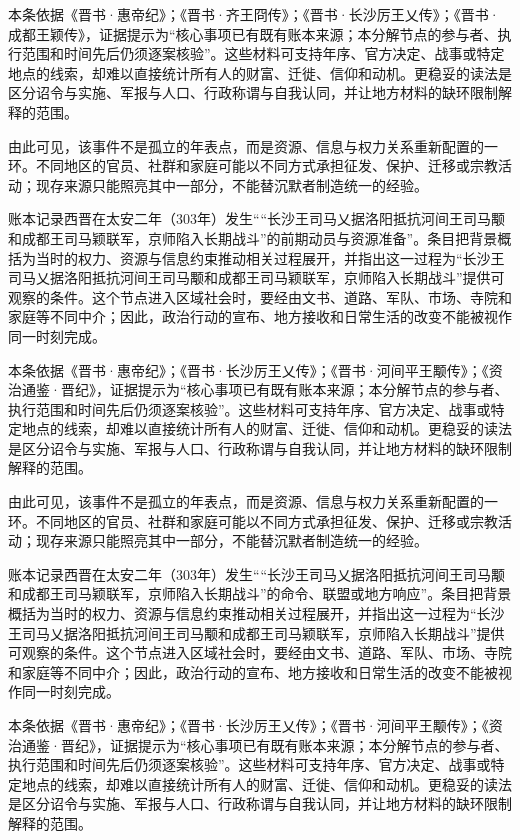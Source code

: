 本条依据《晋书·惠帝纪》；《晋书·齐王冏传》；《晋书·长沙厉王乂传》；《晋书·成都王颖传》，证据提示为“核心事项已有既有账本来源；本分解节点的参与者、执行范围和时间先后仍须逐案核验”。这些材料可支持年序、官方决定、战事或特定地点的线索，却难以直接统计所有人的财富、迁徙、信仰和动机。更稳妥的读法是区分诏令与实施、军报与人口、行政称谓与自我认同，并让地方材料的缺环限制解释的范围。

由此可见，该事件不是孤立的年表点，而是资源、信息与权力关系重新配置的一环。不同地区的官员、社群和家庭可能以不同方式承担征发、保护、迁移或宗教活动；现存来源只能照亮其中一部分，不能替沉默者制造统一的经验。

账本记录西晋在太安二年（303年）发生““长沙王司马乂据洛阳抵抗河间王司马颙和成都王司马颖联军，京师陷入长期战斗”的前期动员与资源准备”。条目把背景概括为当时的权力、资源与信息约束推动相关过程展开，并指出这一过程为“长沙王司马乂据洛阳抵抗河间王司马颙和成都王司马颖联军，京师陷入长期战斗”提供可观察的条件。这个节点进入区域社会时，要经由文书、道路、军队、市场、寺院和家庭等不同中介；因此，政治行动的宣布、地方接收和日常生活的改变不能被视作同一时刻完成。

本条依据《晋书·惠帝纪》；《晋书·长沙厉王乂传》；《晋书·河间平王颙传》；《资治通鉴·晋纪》，证据提示为“核心事项已有既有账本来源；本分解节点的参与者、执行范围和时间先后仍须逐案核验”。这些材料可支持年序、官方决定、战事或特定地点的线索，却难以直接统计所有人的财富、迁徙、信仰和动机。更稳妥的读法是区分诏令与实施、军报与人口、行政称谓与自我认同，并让地方材料的缺环限制解释的范围。

由此可见，该事件不是孤立的年表点，而是资源、信息与权力关系重新配置的一环。不同地区的官员、社群和家庭可能以不同方式承担征发、保护、迁移或宗教活动；现存来源只能照亮其中一部分，不能替沉默者制造统一的经验。

账本记录西晋在太安二年（303年）发生““长沙王司马乂据洛阳抵抗河间王司马颙和成都王司马颖联军，京师陷入长期战斗”的命令、联盟或地方响应”。条目把背景概括为当时的权力、资源与信息约束推动相关过程展开，并指出这一过程为“长沙王司马乂据洛阳抵抗河间王司马颙和成都王司马颖联军，京师陷入长期战斗”提供可观察的条件。这个节点进入区域社会时，要经由文书、道路、军队、市场、寺院和家庭等不同中介；因此，政治行动的宣布、地方接收和日常生活的改变不能被视作同一时刻完成。

本条依据《晋书·惠帝纪》；《晋书·长沙厉王乂传》；《晋书·河间平王颙传》；《资治通鉴·晋纪》，证据提示为“核心事项已有既有账本来源；本分解节点的参与者、执行范围和时间先后仍须逐案核验”。这些材料可支持年序、官方决定、战事或特定地点的线索，却难以直接统计所有人的财富、迁徙、信仰和动机。更稳妥的读法是区分诏令与实施、军报与人口、行政称谓与自我认同，并让地方材料的缺环限制解释的范围。

